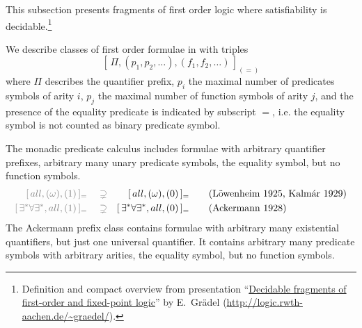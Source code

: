 
This subsection presents fragments of first order logic where satisfiability is decidable.\footnote{
	Definition and compact overview from presentation
	“\href{http://logic.rwth-aachen.de/~graedel/kalmar.pdf}{Decidable fragments of first-order and fixed-point logic}”
	by E.~Grädel (\url{http://logic.rwth-aachen.de/~graedel/}).	
}  


\begin{definition}\label{def:prefix:class}
	We describe classes of first order formulae in \PNF with triples
	\[
		[\, \Pi, (p_1,p_2,\ldots), (f_1,f_2,\ldots)\,]_{(=)}
	\]
	where $\Pi$ describes the quantifier prefix,
	$p_i$ the maximal number of predicates symbols of arity $i$,
	$p_j$ the maximal number of function symbols of arity $j$,
	and the presence of the equality predicate is indicated by subscript $=$,
	i.e. the equality symbol is not counted as binary predicate symbol.
\end{definition}

\begin{example}
	The monadic predicate calculus includes formulae with arbitrary quantifier prefixes, 
	arbitrary many unary predicate symbols, the equality symbol, but no function symbols.
	\begin{align*}
	\colG [\,all, (\omega), (1)\,]_= 
	\quad\supsetneq& &
		[\,all, (\omega), (0 )&\,]_=
		 \tag{Löwenheim 1925, Kalmár 1929}
	\\
	\colG [\,\exists^*\forall\exists^*,all,(1)\,]_=
	\quad\supsetneq& &
	[\,\exists^*\forall\exists^*,all,(0)&\,]_{=} \tag{Ackermann 1928}
	\end{align*}
	The Ackermann prefix class contains formulae with arbitrary many existential quantifiers, 
	but just one universal quantifier. It contains arbitrary many predicate symbols
	with arbitrary arities, the equality symbol, but no function symbols. 
\end{example}


